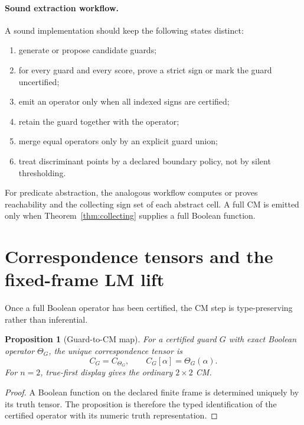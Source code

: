 \documentclass[11pt]{article}
\newtheorem{proposition}[theorem]{Proposition}
\theoremstyle{definition}
\theoremstyle{remark}
\begin{document}
\paragraph{Sound extraction workflow.}
A sound implementation should keep the following states distinct:
\begin{enumerate}[leftmargin=2em]
\item generate or propose candidate guards;
\item for every guard and every score, prove a strict sign or mark the guard uncertified;
\item emit an operator only when all indexed signs are certified;
\item retain the guard together with the operator;
\item merge equal operators only by an explicit guard union;
\item treat discriminant points by a declared boundary policy, not by silent thresholding.
\end{enumerate}

For predicate abstraction, the analogous workflow computes or proves reachability and the collecting sign set of each abstract cell. A full CM is emitted only when Theorem~\ref{thm:collecting} supplies a full Boolean function.

\section{Correspondence tensors and the fixed-frame LM lift}\label{sec:lmlift}

Once a full Boolean operator has been certified, the CM step is type-preserving rather than inferential.

\begin{proposition}[Guard-to-CM map]\label{prop:guardcm}
For a certified guard $G$ with exact Boolean operator $\Theta_G$, the unique correspondence tensor is
\[
 C_G=C_{\Theta_G},
 \qquad C_G[\alpha]=\Theta_G(\alpha).
\]
For $n=2$, true-first display gives the ordinary $2\times2$ CM.
\end{proposition}

\begin{proof}
A Boolean function on the declared finite frame is determined uniquely by its truth tensor. The proposition is therefore the typed identification of the certified operator with its numeric truth representation.
\end{proof}
\end{document}
